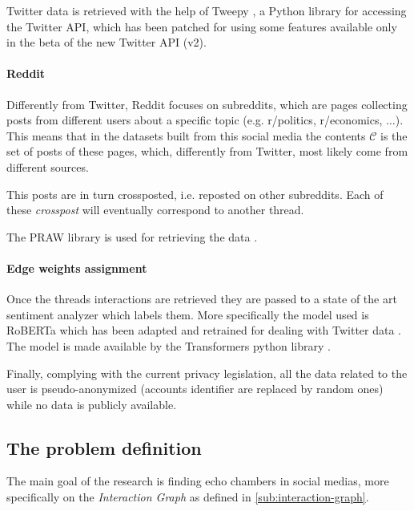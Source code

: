 Twitter data is retrieved with the help of Tweepy \cite{tweepy}, a Python
library for accessing the Twitter API, which has been patched for using some
features available only in the beta of the new Twitter API (v2).

\paragraph{Reddit}%
\label{par:reddit}

Differently from Twitter, Reddit focuses on subreddits, which are pages
collecting posts from different users about a specific topic (e.g. r/politics,
r/economics, $\dots$). This means that
in the datasets built from this social media the contents $\mathcal{C} $ is the
set of posts of these pages, which, differently from Twitter, most likely
come from different sources.

This posts are in turn crossposted, i.e. reposted on other subreddits. Each of
these \emph{crosspost} will eventually correspond to another thread.

The PRAW library is used for retrieving the data \cite{praw}.

\paragraph{Edge weights assignment}%
\label{par:assigning_edge_weights}

Once the threads interactions are retrieved they are passed to a state of the
art sentiment analyzer which labels them. More specifically the model used is
RoBERTa which has been adapted and retrained for dealing with Twitter
data \cite{Barbieri2020}. The model is made available by the Transformers
python library \cite{wolf-etal-2020-transformers}.

\bigskip

Finally, complying with the current privacy legislation, all the data related
to the user is pseudo-anonymized (accounts identifier are replaced by random
ones) while no data is publicly available.

\subsection{The problem definition}%
\label{sub:the_problem_definition}

The main goal of the research is finding echo chambers in social medias, more
specifically on the \emph{Interaction Graph} as defined in
\autoref{sub:interaction-graph}.

